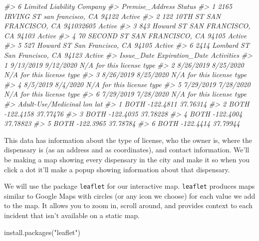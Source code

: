\documentclass[
  12pt,
  openany]{book}
\newenvironment{Shaded}{\begin{snugshade}}{\end{snugshade}}
\newcommand{\CommentTok}[1]{\textcolor[rgb]{0.37,0.37,0.37}{\textit{#1}}}
\newcommand{\FunctionTok}[1]{\textcolor[rgb]{0,0,0}{#1}}
\newcommand{\NormalTok}[1]{#1}
\newcommand{\StringTok}[1]{\textcolor[rgb]{0.5,0.5,0.5}{#1}}
\begin{document}
\begin{Shaded}
\begin{Highlighting}[]
\CommentTok{\#\textgreater{} 6 Limited Liability Company}
\CommentTok{\#\textgreater{}                           Premise\_Address Status}
\CommentTok{\#\textgreater{} 1  2165 IRVING ST san francisco, CA 94122 Active}
\CommentTok{\#\textgreater{} 2 122 10TH ST SAN FRANCISCO, CA 941032605 Active}
\CommentTok{\#\textgreater{} 3   843 Howard ST SAN FRANCISCO, CA 94103 Active}
\CommentTok{\#\textgreater{} 4    70 SECOND ST SAN FRANCISCO, CA 94105 Active}
\CommentTok{\#\textgreater{} 5   527 Howard ST San Francisco, CA 94105 Active}
\CommentTok{\#\textgreater{} 6 2414 Lombard ST San Francisco, CA 94123 Active}
\CommentTok{\#\textgreater{}   Issue\_Date Expiration\_Date                Activities}
\CommentTok{\#\textgreater{} 1  9/13/2019       9/12/2020 N/A for this license type}
\CommentTok{\#\textgreater{} 2  8/26/2019       8/25/2020 N/A for this license type}
\CommentTok{\#\textgreater{} 3  8/26/2019       8/25/2020 N/A for this license type}
\CommentTok{\#\textgreater{} 4   8/5/2019        8/4/2020 N/A for this license type}
\CommentTok{\#\textgreater{} 5  7/29/2019       7/28/2020 N/A for this license type}
\CommentTok{\#\textgreater{} 6  7/29/2019       7/28/2020 N/A for this license type}
\CommentTok{\#\textgreater{}   Adult{-}Use/Medicinal       lon      lat}
\CommentTok{\#\textgreater{} 1                BOTH {-}122.4811 37.76314}
\CommentTok{\#\textgreater{} 2                BOTH {-}122.4158 37.77476}
\CommentTok{\#\textgreater{} 3                BOTH {-}122.4035 37.78228}
\CommentTok{\#\textgreater{} 4                BOTH {-}122.4004 37.78823}
\CommentTok{\#\textgreater{} 5                BOTH {-}122.3965 37.78784}
\CommentTok{\#\textgreater{} 6                BOTH {-}122.4414 37.79944}
\end{Highlighting}
\end{Shaded}

This data has information about the type of license, who the owner is, where the dispensary is (as an address and as coordinates), and contact information. We'll be making a map showing every dispensary in the city and make it so when you click a dot it'll make a popup showing information about that dispensary.

We will use the package \texttt{leaflet} for our interactive map. \texttt{leaflet} produces maps similar to Google Maps with circles (or any icon we choose) for each value we add to the map. It allows you to zoom in, scroll around, and provides context to each incident that isn't available on a static map.

\begin{Shaded}
\begin{Highlighting}[]
\FunctionTok{install.packages}\NormalTok{(}\StringTok{"leaflet"}\NormalTok{)}
\end{Highlighting}
\end{Shaded}
\end{document}
